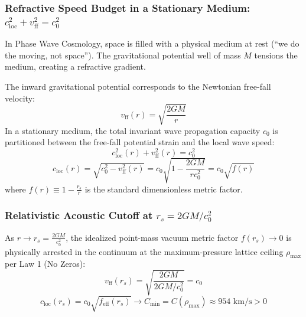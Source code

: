 \documentclass[11pt,a4paper]{article}
\begin{document}
\subsubsection{Refractive Speed Budget in a Stationary Medium: $c_{\text{loc}}^2 + v_{\text{ff}}^2 = c_0^2$}
\label{subsubsec:refractive_budget}

In Phase Wave Cosmology, space is filled with a physical medium at rest (``we do the moving, not space''). The gravitational potential well of mass $M$ tensions the medium, creating a refractive gradient.

The inward gravitational potential corresponds to the Newtonian free-fall velocity:
\begin{equation}
v_{\text{ff}}(r) = \sqrt{\frac{2GM}{r}}
\end{equation}
In a stationary medium, the total invariant wave propagation capacity $c_0$ is partitioned between the free-fall potential strain and the local wave speed:
\begin{equation}
c_{\text{loc}}^2(r) + v_{\text{ff}}^2(r) = c_0^2
\label{eq:speed_budget}
\end{equation}
\begin{equation}
c_{\text{loc}}(r) = \sqrt{c_0^2 - v_{\text{ff}}^2(r)} = c_0 \sqrt{1 - \frac{2GM}{r c_0^2}} = c_0 \sqrt{f(r)}
\label{eq:c_loc_def}
\end{equation}
where $f(r) \equiv 1 - \frac{r_s}{r}$ is the standard dimensionless metric factor.

\subsubsection{Relativistic Acoustic Cutoff at $r_s = 2GM/c_0^2$}
\label{subsubsec:acoustic_cutoff}

As $r \to r_s = \frac{2GM}{c_0^2}$, the idealized point-mass vacuum metric factor $f(r_s) \to 0$ is physically arrested in the continuum at the maximum-pressure lattice ceiling $\rho_{\max}$ per Law 1 (No Zeros):
\begin{equation}
v_{\text{ff}}(r_s) = \sqrt{\frac{2GM}{2GM/c_0^2}} = c_0
\end{equation}
\begin{equation}
c_{\text{loc}}(r_s) = c_0\sqrt{f_{\text{eff}}(r_s)} \longrightarrow C_{\min} = C(\rho_{\max}) \approx 954\text{ km/s} > 0
\end{equation}
\end{document}
